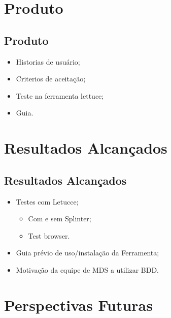 \documentclass{beamer}
\begin{document}
\section{Produto}
\subsection{Produto}
\begin{frame}
    \begin{itemize}
        \item Historias de usuário;
        \item Criterios de aceitação;
        \item Teste na ferramenta lettuce;
        \item Guia.
    \end{itemize}
\end{frame}

\section{Resultados Alcançados} %
\subsection{Resultados Alcançados}
\begin{frame}
  \begin{itemize}
      \item Testes com Letucce;
        \begin{itemize}
          \item Com e sem Splinter;
          \item Test browser.
        \end{itemize}
      \item Guia prévio de uso/instalação da Ferramenta;
      \item Motivação da equipe de MDS a utilizar BDD.
  \end{itemize}
\end{frame}

\section{Perspectivas Futuras} %
\end{document}

